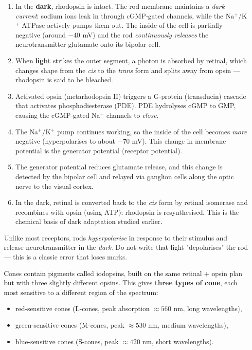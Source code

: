 \documentclass[11pt]{article}
\newcommand{\cle}[1]{{\popxbold\color{popdark}#1}}
\newcounter{popsec}
\newcounter{popsub}
\newcommand{\courssub}[1]{%
  \stepcounter{popsub}%
  \par\vspace{9pt}\noindent{\popxbold\fontsize{11.5}{13}\selectfont\color{popink}{\color{poporange}\thepopsec.\thepopsub}\hspace{6pt}#1}\par\nopagebreak\vspace{4pt}
}
\begin{document}
\begin{enumerate}
\item In the \textbf{dark}, rhodopsin is intact. The rod membrane maintains a \emph{dark current}: sodium ions leak in through cGMP-gated channels, while the Na$^+$/K$^+$ ATPase actively pumps them out. The inside of the cell is partially negative (around $-40$ mV) and the rod \emph{continuously releases} the neurotransmitter glutamate onto its bipolar cell.
\item When \textbf{light} strikes the outer segment, a photon is absorbed by retinal, which changes shape from the \emph{cis} to the \emph{trans} form and splits away from opsin — rhodopsin is said to be \cle{bleached}.
\item Activated opsin (metarhodopsin II) triggers a G-protein (transducin) cascade that activates phosphodiesterase (PDE). PDE hydrolyses cGMP to GMP, causing the cGMP-gated Na$^+$ channels to \emph{close}.
\item The Na$^+$/K$^+$ pump continues working, so the inside of the cell becomes \emph{more} negative (hyperpolarises to about $-70$ mV). This change in membrane potential is the \cle{generator potential} (receptor potential).
\item The generator potential reduces glutamate release, and this change is detected by the bipolar cell and relayed via ganglion cells along the optic nerve to the visual cortex.
\item In the dark, retinal is converted back to the \emph{cis} form by retinal isomerase and recombines with opsin (using ATP): rhodopsin is \cle{resynthesised}. This is the chemical basis of \cle{dark adaptation} studied earlier.
\end{enumerate}

\begin{attention}
Unlike most receptors, rods \emph{hyperpolarise} in response to their stimulus and release neurotransmitter in the \emph{dark}. Do not write that light "depolarises" the rod — this is a classic error that loses marks.
\end{attention}

\courssub{Cones and Colour Vision}

Cones contain pigments called \cle{iodopsins}, built on the same retinal + opsin plan but with three slightly different opsins. This gives \textbf{three types of cone}, each most sensitive to a different region of the spectrum:

\begin{itemize}
\item \cle{red-sensitive} cones (L-cones, peak absorption $\approx 560$ nm, long wavelengths),
\item \cle{green-sensitive} cones (M-cones, peak $\approx 530$ nm, medium wavelengths),
\item \cle{blue-sensitive} cones (S-cones, peak $\approx 420$ nm, short wavelengths).
\end{itemize}
\end{document}
